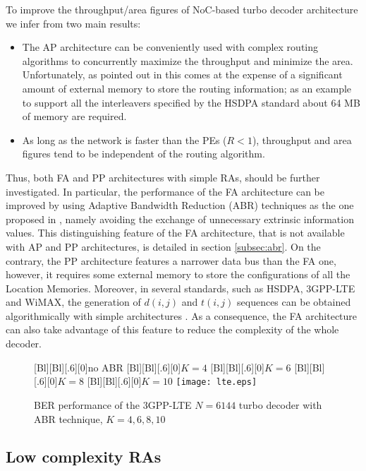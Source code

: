 \documentclass[10pt,twocolumn,journal]{IEEEtran}
\begin{document}
To improve the throughput/area figures of NoC-based turbo decoder architecture we infer from
\cite{martina_TCASI10} two main results:
\begin{itemize}
\item The AP architecture can be conveniently used with complex routing 
algorithms to concurrently maximize the throughput and minimize the area. Unfortunately, as pointed out 
in \cite{martina_MPMS11} this comes at the expense of a significant amount of external memory 
to store the routing information; as an example to support all the interleavers specified by the HSDPA 
standard \cite{hsdpa} about 64 MB of memory are required. 
\item As long as the network is faster than the PEs ($R<1$), throughput and area figures tend to be 
independent of the routing algorithm. 
\end{itemize}
Thus, both FA and PP architectures with simple RAs, should be further investigated. 
In particular, the performance of the FA architecture can be improved by using Adaptive Bandwidth Reduction (ABR) techniques 
as the one proposed in \cite{baghdadi_EL06}, namely avoiding the exchange of unnecessary extrinsic information values.
This distinguishing feature of the FA architecture, that is not available with AP and PP architectures, is detailed 
in section \ref{subsec:abr}.
On the contrary, the PP architecture features a narrower data bus than the FA one, however, it requires some external 
memory to store the configurations of all the Location Memories. 
Moreover, in several standards, such as HSDPA, 3GPP-LTE and WiMAX, the generation of $d(i,j)$ and $t(i,j)$ sequences 
can be obtained algorithmically with simple architectures \cite{kim_CICC09, wang_TCAS207, martina_CL08}. 
As a consequence, the FA architecture can also take advantage of this feature to reduce the complexity of the whole 
decoder.
\begin{figure}[t!]
  \centering
  [Bl][Bl][.6][0]{no ABR}
  [Bl][Bl][.6][0]{$K=4$}
  [Bl][Bl][.6][0]{$K=6$}
  [Bl][Bl][.6][0]{$K=8$}
  [Bl][Bl][.6][0]{$K=10$}
  \texttt{[image: lte.eps]}
\caption{BER performance of the 3GPP-LTE $N=6144$ turbo decoder with ABR technique, $K=4, 6, 8, 10$} 
\label{fig:lte}
\end{figure}

\subsection{Low complexity RAs}
\end{document}
